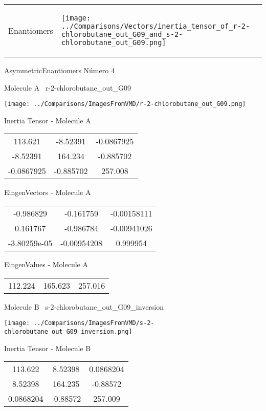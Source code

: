 \vtab[-5mm]
\begin{tabular}{*{2}{m{}}}
\begin{center}
\textcolor{NavyBlue}{\Large Enantiomers}
\end{center}
&
\begin{center}
\texttt{[image: ../Comparisons/Vectors/inertia\_tensor\_of\_r-2-chlorobutane\_out\_G09\_and\_s-2-chlorobutane\_out\_G09.png]}
\end{center}
\end{tabular}

 \newpage

\vtab[-3cm]
\begin{center}
{\large AsymmetricEnantiomers \tab Número 4}
\end{center}
\begin{multicols}{2}
\begin{center}

Molecule A \
r-2-chlorobutane\_out\_G09

\texttt{[image: ../Comparisons/ImagesFromVMD/r-2-chlorobutane\_out\_G09.png]}

Inertia Tensor - Molecule A \\
\begin{tabular}{|c c c|}
113.621	 & 	-8.52391	 & 	-0.0867925	 \\
-8.52391	 & 	164.234	 & 	-0.885702	 \\
-0.0867925	 & 	-0.885702	 & 	257.008
\end{tabular}

\vtab
 EingenVectors - Molecule A     \\
\begin{tabular}{|c c c|}
-0.986829	 & 	-0.161759	 & 	-0.00158111	 \\
0.161767	 & 	-0.986784	 & 	-0.00941026	 \\
-3.80259e-05	 & 	-0.00954208	 & 	0.999954
\end{tabular}

\vtab
 EingenValues - Molecule A     \\
\begin{tabular}{|c c c|}
112.224	 & 	165.623	 & 	257.016	 \\
\end{tabular}
\columnbreak

Molecule B \
s-2-chlorobutane\_out\_G09\_inversion

\texttt{[image: ../Comparisons/ImagesFromVMD/s-2-chlorobutane\_out\_G09\_inversion.png]}

Inertia Tensor - Molecule B \\
\begin{tabular}{|c c c|}
113.622	 & 	8.52398	 & 	0.0868204	 \\
8.52398	 & 	164.235	 & 	-0.88572	 \\
0.0868204	 & 	-0.88572	 & 	257.009
\end{tabular}


\end{center}
\end{multicols}
